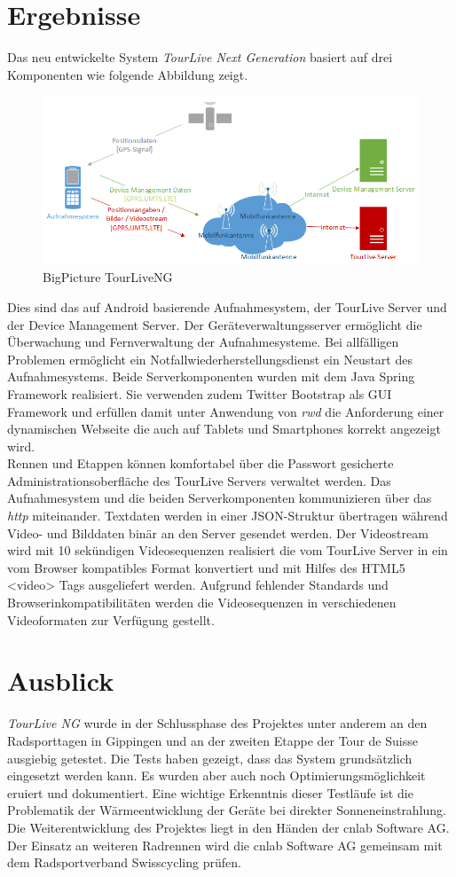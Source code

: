 \section*{Ergebnisse}
Das neu entwickelte System \textit{TourLive Next Generation} basiert auf drei Komponenten wie folgende Abbildung zeigt. 
\begin{figure}[H]
	\centering
	\includegraphics[width=140mm]{images/android/BigPicture_AndroidClient.png} 
	\caption{BigPicture TourLiveNG}
\end{figure}
Dies sind das auf Android basierende Aufnahmesystem, der TourLive Server und der Device Management Server. Der Geräteverwaltungsserver ermöglicht die Überwachung und Fernverwaltung der Aufnahmesysteme. Bei allfälligen Problemen ermöglicht ein Notfallwiederherstellungsdienst ein Neustart des Aufnahmesystems. Beide Serverkomponenten wurden mit dem Java Spring Framework realisiert. Sie verwenden zudem Twitter Bootstrap als GUI Framework und erfüllen damit unter Anwendung von \textit{\gls{rwd}} die Anforderung einer dynamischen Webseite die auch auf Tablets und Smartphones korrekt angezeigt wird. 
\\

Rennen und Etappen können komfortabel über die Passwort gesicherte Administrationsoberfläche des TourLive Servers verwaltet werden. Das Aufnahmesystem und die beiden Serverkomponenten kommunizieren über das \textit{\gls{http}} miteinander. Textdaten werden in einer JSON-Struktur übertragen während Video- und Bilddaten binär an den Server gesendet  werden. Der Videostream wird mit 10 sekündigen Videosequenzen realisiert die vom TourLive Server in ein vom Browser kompatibles Format konvertiert und mit Hilfes des HTML5 <video> Tags ausgeliefert werden. Aufgrund fehlender Standards und Browserinkompatibilitäten werden die Videosequenzen in verschiedenen Videoformaten zur Verfügung gestellt.


\section*{Ausblick}
\textit{TourLive NG} wurde in der Schlussphase des Projektes unter anderem an den Radsporttagen in Gippingen und an der zweiten Etappe der Tour de Suisse ausgiebig getestet. Die Tests haben gezeigt, dass das System grundsätzlich eingesetzt werden kann. Es wurden aber auch noch Optimierungsmöglichkeit eruiert und dokumentiert. Eine wichtige Erkenntnis dieser Testläufe ist die Problematik der Wärmeentwicklung der Geräte bei direkter Sonneneinstrahlung.
\\

Die Weiterentwicklung des Projektes liegt in den Händen der cnlab Software AG. Der Einsatz an weiteren Radrennen wird die cnlab Software AG gemeinsam mit dem Radsportverband Swisscycling prüfen.

